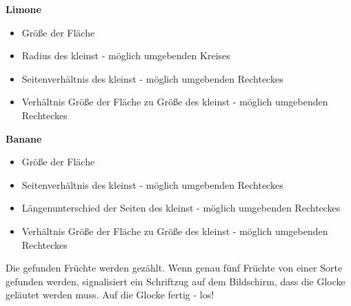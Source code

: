 \textbf{Limone}

\begin{itemize}
    \item Größe der Fläche
    \item Radius des kleinst - möglich umgebenden Kreises
    \item Seitenverhältnis des kleinst - möglich umgebenden Rechteckes
     \item Verhältnis Größe der Fläche zu Größe des kleinst - möglich umgebenden Rechteckes
\end{itemize}

\textbf{Banane}

\begin{itemize}
    \item Größe der Fläche
    \item Seitenverhältnis des kleinst - möglich umgebenden Rechteckes
    \item Längenunterschied der Seiten des kleinst - möglich umgebenden Rechteckes
    \item Verhältnis Größe der Fläche zu Größe des kleinst - möglich umgebenden Rechteckes
\end{itemize}

Die gefunden Früchte werden gezählt. Wenn genau fünf Früchte von einer Sorte gefunden werden, signalisiert ein Schriftzug auf dem Bildschirm, dass die Glocke geläutet werden muss. Auf die Glocke fertig - los!








 


